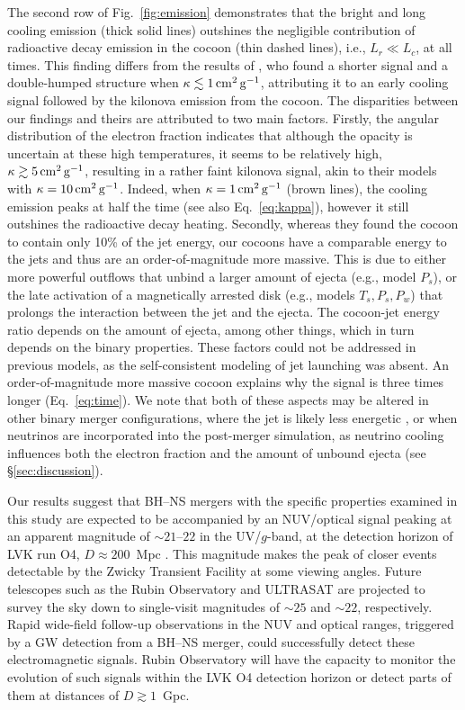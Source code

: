 \documentclass[twocolumn,dvipsnames]{aastex62}
\begin{document}
The second row of Fig.~\ref{fig:emission} demonstrates that the bright and long cooling emission (thick solid lines) outshines the negligible contribution of radioactive decay emission in the cocoon (thin dashed lines), i.e., $ L_r \ll L_c $, at all times. This finding differs from the results of \citet{Gottlieb2018a,Gottlieb2020c}, who found a shorter signal and a double-humped structure when $ \kappa \lesssim 1\,{\rm cm^2\,g^{-1}} $, attributing it to an early cooling signal followed by the kilonova emission from the cocoon. The disparities between our findings and theirs are attributed to two main factors. Firstly, the angular distribution of the electron fraction indicates that although the opacity is uncertain at these high temperatures, it seems to be relatively high, $ \kappa \gtrsim 5\,{\rm cm^2\,g^{-1}} $, resulting in a rather faint kilonova signal, akin to their models with $ \kappa = 10\,{\rm cm^2\,g^{-1}} $. Indeed, when $ \kappa = 1\,{\rm cm^2\,g^{-1}} $ (brown lines), the cooling emission peaks at half the time (see also Eq.~\eqref{eq:kappa}), however it still outshines the radioactive decay heating. Secondly, whereas they found the cocoon to contain only 10\% of the jet energy, our cocoons have a comparable energy to the jets and thus are an order-of-magnitude more massive. This is due to either more powerful outflows that unbind a larger amount of ejecta (e.g., model $ P_s $), or the late activation of a magnetically arrested disk (e.g., models $ T_s, P_s, P_w $) that prolongs the interaction between the jet and the ejecta. The cocoon-jet energy ratio depends on the amount of ejecta, among other things, which in turn depends on the binary properties. These factors could not be addressed in previous models, as the self-consistent modeling of jet launching was absent. An order-of-magnitude more massive cocoon explains why the signal is three times longer (Eq.~\eqref{eq:time}). We note that both of these aspects may be altered in other binary merger configurations, where the jet is likely less energetic \citep[see][]{Gottlieb2023}, or when neutrinos are incorporated into the post-merger simulation, as neutrino cooling influences both the electron fraction and the amount of unbound ejecta (see \S\ref{sec:discussion}).

Our results suggest that BH--NS mergers with the specific properties examined in this study are expected to be accompanied by an NUV/optical signal peaking at an apparent magnitude of $ \sim 21 \mbox{--} 22 $ in the UV/$g$-band, at the detection horizon of LVK run O4, $ D \approx 200 $~Mpc \citep{Abbott2020}. This magnitude makes the peak of closer events detectable by the Zwicky Transient Facility \citep[ZTF;][]{Graham2019,Dekany2020} at some viewing angles. Future telescopes such as the Rubin Observatory \citep{LSST2009} and ULTRASAT \citep{Ben-Ami2022,Shvartzvald2023} are projected to survey the sky down to single-visit magnitudes of $ \sim 25 $ and $ \sim 22 $, respectively. Rapid wide-field follow-up observations in the NUV and optical ranges, triggered by a GW detection from a BH--NS merger, could successfully detect these electromagnetic signals. Rubin Observatory will have the capacity to monitor the evolution of such signals within the LVK O4 detection horizon or detect parts of them at distances of $ D \gtrsim 1 $~Gpc.
\end{document}
